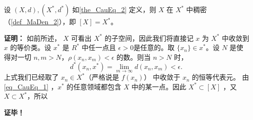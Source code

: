 \begin{theorem}{}
设 $(X,d),(X^*,d^*)$ 如\autoref{the_CauEq_2} 定义，则 $X$ 在 $X^*$ 中稠密（\autoref{def_MaDen_2}），即 $[X]=X^*$。
\end{theorem}

\textbf{证明：}
如前所述， $X$ 可看出 $X^*$ 的子空间，因此我们将直接记 $x$ 为 $X^*$ 中收敛到 $x$ 的等价类。设 $x^*$ 是 $R^*$ 中任一点且 $\epsilon>0$是任意的。取 $\{x_n\}\in x^*$。设 $N$ 是使得对一切 $n,m>N$，$\rho(x_n,x_m)<\epsilon$ 的数。则当 $n>N$ 时，
\begin{equation}\label{eq_CauEq_1}
d^*(x_n,x^*)=\lim_{m\rightarrow\infty} d(x_n,x_m)<\epsilon.~
\end{equation}
上式我们已经取了 $x_n\in X^*$（严格说是 $f(x_n)$） 中收敛于 $x_n$ 的恒等代表元。 由\autoref{eq_CauEq_1} ，$x^*$ 的任意领域都包含 $X$ 中的某一点。因此 $X^*\subset [X]$ ，又 $X\subset X^*$，所以

\textbf{证毕！}
